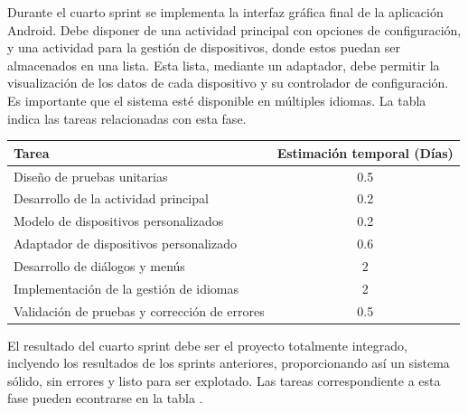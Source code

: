 \documentclass[12pt]{article}
\begin{document}
            Durante el cuarto sprint se implementa la interfaz gráfica final de la aplicación Android. Debe disponer de una actividad principal con opciones de configuración, y una actividad para la gestión de dispositivos, donde estos puedan ser almacenados en una lista. Esta lista, mediante un adaptador, debe permitir la visualización de los datos de cada dispositivo y su controlador de configuración. Es importante que el sistema esté disponible en múltiples idiomas. La tabla  indica las tareas relacionadas con esta fase.

            \begin{tabular}{|l|c|}
                \hline
                \textbf{Tarea}                                                              &   \textbf{Estimación temporal} (Días) \\           
                \hline
                Diseño de pruebas unitarias                                                 &   0.5                                 \\
                Desarrollo de la actividad principal                                        &   0.2                                 \\
                Modelo de dispositivos personalizados                                       &   0.2                                 \\
                Adaptador de dispositivos personalizado                                     &   0.6                                 \\
                Desarrollo de diálogos y menús                                              &   2                                   \\
                Implementación de la gestión de idiomas                                     &   2                                   \\
                Validación de pruebas y corrección de errores                               &   0.5                                 \\
                \hline
            \end{tabular}

            El resultado del cuarto sprint debe ser el proyecto totalmente integrado, inclyendo los resultados de los sprints anteriores, proporcionando así un sistema sólido, sin errores y listo para ser explotado. Las tareas correspondiente a esta fase pueden econtrarse en la tabla .
\end{document}
